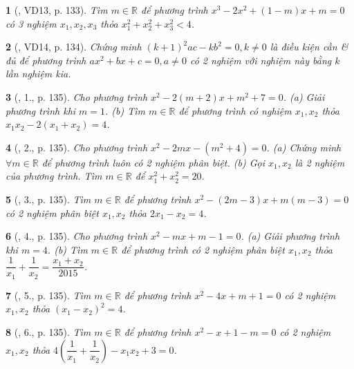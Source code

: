 \documentclass{article}
\newtheorem{baitoan}{}
\begin{document}
\begin{baitoan}[\cite{Thu_Viet_Minh_ptb2}, VD13, p. 133]
	Tìm $m\in\mathbb{R}$ để phương trình $x^3 - 2x^2 + (1 - m)x + m = 0$ có 3 nghiệm $x_1,x_2,x_3$ thỏa $x_1^2 + x_2^2 + x_3^2 < 4$.
\end{baitoan}

\begin{baitoan}[\cite{Thu_Viet_Minh_ptb2}, VD14, p. 134]
	Chứng minh $(k + 1)^2ac - kb^2 = 0,k\ne0$ là điều kiện cần \& đủ để phương trình $ax^2 + bx + c = 0,a\ne0$ có 2 nghiệm với nghiệm này bằng $k$ lần nghiệm kia.
\end{baitoan}

\begin{baitoan}[\cite{Thu_Viet_Minh_ptb2}, 1., p. 135]
	Cho phương trình $x^2 - 2(m + 2)x + m^2 + 7 = 0$. (a) Giải phương trình khi $m = 1$. (b) Tìm $m\in\mathbb{R}$ để phương trình có nghiệm $x_1,x_2$ thỏa $x_1x_2 - 2(x_1 + x_2) = 4$.
\end{baitoan}

\begin{baitoan}[\cite{Thu_Viet_Minh_ptb2}, 2., p. 135]
	Cho phương trình $x^2 - 2mx - (m^2 + 4) = 0$. (a) Chứng minh $\forall m\in\mathbb{R}$ để phương trình luôn có 2 nghiệm phân biệt. (b) Gọi $x_1,x_2$ là 2 nghiệm của phương trình. Tìm $m\in\mathbb{R}$ để $x_1^2 + x_2^2 = 20$.
\end{baitoan}

\begin{baitoan}[\cite{Thu_Viet_Minh_ptb2}, 3., p. 135]
	Tìm $m\in\mathbb{R}$ để phương trình $x^2 - (2m - 3)x + m(m - 3) = 0$ có 2 nghiệm phân biệt $x_1,x_2$ thỏa $2x_1 - x_2 = 4$.
\end{baitoan}

\begin{baitoan}[\cite{Thu_Viet_Minh_ptb2}, 4., p. 135]
	Cho phương trình $x^2 - mx + m - 1 = 0$. (a) Giải phương trình khi $m = 4$. (b) Tìm $m\in\mathbb{R}$ để phương trình có 2 nghiệm phân biệt $x_1,x_2$ thỏa $\dfrac{1}{x_1} + \dfrac{1}{x_2} = \dfrac{x_1 + x_2}{2015}$.
\end{baitoan}

\begin{baitoan}[\cite{Thu_Viet_Minh_ptb2}, 5., p. 135]
	Tìm $m\in\mathbb{R}$ để phương trình $x^2 - 4x + m + 1 = 0$ có 2 nghiệm $x_1,x_2$ thỏa $(x_1 - x_2)^2 = 4$.
\end{baitoan}

\begin{baitoan}[\cite{Thu_Viet_Minh_ptb2}, 6., p. 135]
	Tìm $m\in\mathbb{R}$ để phương trình $x^2 - x + 1 - m = 0$ có 2 nghiệm $x_1,x_2$ thỏa $4\left(\dfrac{1}{x_1} + \dfrac{1}{x_2}\right) - x_1x_2 + 3 = 0$.
\end{baitoan}
\end{document}
